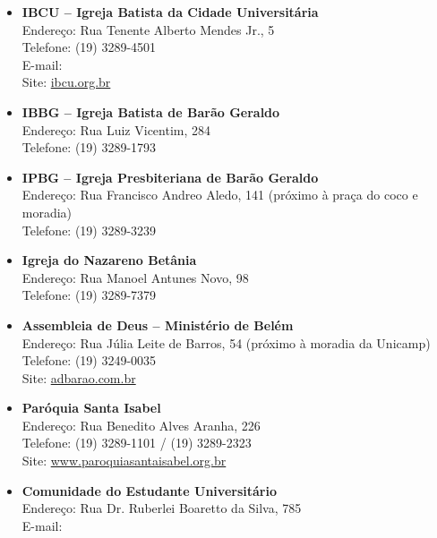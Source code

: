 \begin{itemize}
    \item   \textbf{IBCU -- Igreja Batista da Cidade Universitária}
        \\Endereço: Rua Tenente Alberto Mendes Jr., 5
        \\Telefone: (19) 3289-4501
        \\E-mail: 
        \\Site: \url{ibcu.org.br}

    \item   \textbf{IBBG -- Igreja Batista de Barão Geraldo}
        \\Endereço: Rua Luiz Vicentim, 284
        \\Telefone: (19) 3289-1793

    \item   \textbf{IPBG -- Igreja Presbiteriana de Barão Geraldo}
        \\Endereço: Rua Francisco Andreo Aledo, 141 (próximo à praça do coco e moradia)
        \\Telefone: (19) 3289-3239

    \item   \textbf{Igreja do Nazareno Betânia}
        \\Endereço: Rua Manoel Antunes Novo, 98
        \\Telefone: (19) 3289-7379

    \item   \textbf{Assembleia de Deus -- Ministério de Belém}
        \\Endereço: Rua Júlia Leite de Barros, 54 (próximo à moradia da Unicamp)
        \\Telefone: (19) 3249-0035
        \\Site: \url{adbarao.com.br}

    \item   \textbf{Paróquia Santa Isabel}
        \\Endereço: Rua Benedito Alves Aranha, 226
        \\Telefone: (19) 3289-1101 / (19) 3289-2323
        \\Site: \url{www.paroquiasantaisabel.org.br}

    \item   \textbf{Comunidade do Estudante Universitário}
        \\Endereço: Rua Dr. Ruberlei Boaretto da Silva, 785
        \\E-mail: 
\end{itemize}

